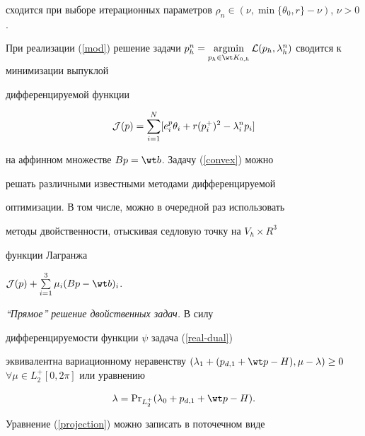 сходится при выборе итерационных параметров $\rho_n\in


(\nu,\min\{\theta_0, r\}-\nu)$, $\nu>0$.





При реализации (\ref{mod}) решение задачи $p_h^{n}=


\argmin\limits_{p_h\in \wt K_{0,h}} {\cal


L}(p_h,\lambda_h^{n})$ сводится к минимизации выпуклой


дифференцируемой функции


\begin{equation}\label{convex}


{\cal J}(p)=\sum\limits_{i=1}^{N}[e^p_i \theta_i +r (p_i^{+})^2


-\lambda^n_i p_i]


\end{equation}


на аффинном множестве $Bp=\wt b$. Задачу (\ref{convex}) можно


решать различными известными методами дифференцируемой


оптимизации. В том числе, можно в очередной раз использовать


методы двойственности, отыскивая седловую точку на $V_h\times R^3$


функции Лагранжа


${\cal J}(p)+\sum\limits_{i=1}^{3} \mu_i (Bp-\wt b)_i$.


\medskip





{\it ``Прямое'' решение двойственных задач.} В силу


дифференцируемости функции $\psi$ задача (\ref{real-dual})


эквивалентна вариационному неравенству $ (\lambda_1 +


(p_{d,1}+\wt p -H), \mu - \lambda)\geq 0$ $\forall \mu \in


{L_{2}^{+}[0,2\pi]}$ или уравнению


\begin{equation}\label{projection}


\lambda=\PR_{L_{2}^{+}}(\lambda_0+p_{d,1}+\wt p -H).


\end{equation}


Уравнение (\ref{projection}) можно записать в поточечном виде


$$


